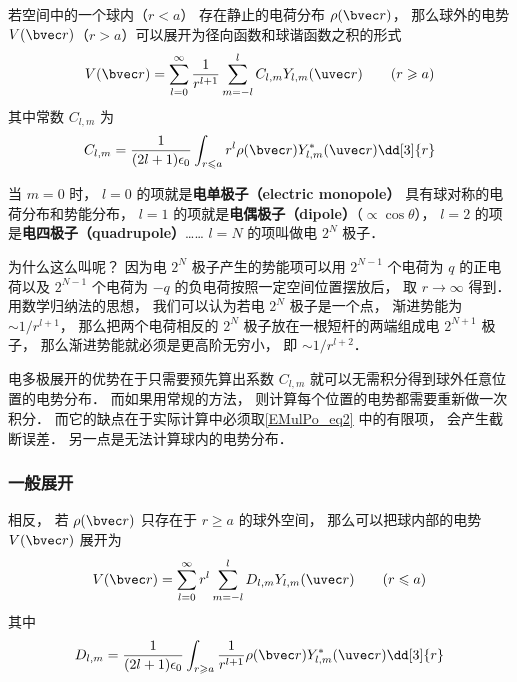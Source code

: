

若空间中的一个球内（$r < a$） 存在静止的电荷分布 $\rho(\bvec r)$， 那么球外的电势 $V(\bvec r)$（$r > a$）可以展开为径向函数和球谐函数之积的形式
\begin{equation}\label{EMulPo_eq2}
V(\bvec r) = \sum_{l = 0}^\infty \frac{1}{r^{l+1}}\sum_{m = -l}^l C_{l,m} Y_{l,m}(\uvec r) \qquad (r \geqslant a)
\end{equation}
其中常数 $C_{l,m}$ 为
\begin{equation}
C_{l,m} = \frac{1}{(2l+1)\epsilon_0} \int_{r\leqslant a} r^l \rho(\bvec r) Y_{l,m}^*(\uvec r) \dd[3]{r}
\end{equation}

当 $m = 0$ 时， $l = 0$ 的项就是\textbf{电单极子（electric monopole）} 具有球对称的电荷分布和势能分布， $l = 1$ 的项就是\textbf{电偶极子（dipole）}（$\propto\cos \theta$）， $l = 2$ 的项是\textbf{电四极子（quadrupole）}…… $l = N$ 的项叫做电 $2^N$ 极子．

为什么这么叫呢？ 因为电 $2^N$ 极子产生的势能项可以用 $2^{N-1}$ 个电荷为 $q$ 的正电荷以及 $2^{N-1}$ 个电荷为 $-q$ 的负电荷按照一定空间位置摆放后， 取 $r \to \infty$ 得到． 用数学归纳法的思想， 我们可以认为若电 $2^N$ 极子是一个点， 渐进势能为 $\sim 1/r^{l+1}$， 那么把两个电荷相反的 $2^N$ 极子放在一根短杆的两端组成电 $2^{N+1}$ 极子， 那么渐进势能就必须是更高阶无穷小， 即 $\sim 1/r^{l+2}$．

电多极展开的优势在于只需要预先算出系数 $C_{l,m}$ 就可以无需积分得到球外任意位置的电势分布． 而如果用常规的方法， 则计算每个位置的电势都需要重新做一次积分． 而它的缺点在于实际计算中必须取\autoref{EMulPo_eq2} 中的有限项， 会产生截断误差． 另一点是无法计算球内的电势分布．

\subsubsection{一般展开}
相反， 若 $\rho(\bvec r)$ 只存在于 $r \geqslant a$ 的球外空间， 那么可以把球内部的电势 $V(\bvec r)$ 展开为
\begin{equation}\label{EMulPo_eq4}
V(\bvec r) = \sum_{l = 0}^\infty r^l \sum_{m = -l}^l D_{l,m} Y_{l,m}(\uvec r) \qquad (r \leqslant a)
\end{equation}
其中
\begin{equation}\label{EMulPo_eq3}
D_{l,m} = \frac{1}{(2l+1)\epsilon_0} \int_{r\geqslant a} \frac{1}{r^{l+1}} \rho(\bvec r) Y_{l,m}^*(\uvec r) \dd[3]{r}
\end{equation}

